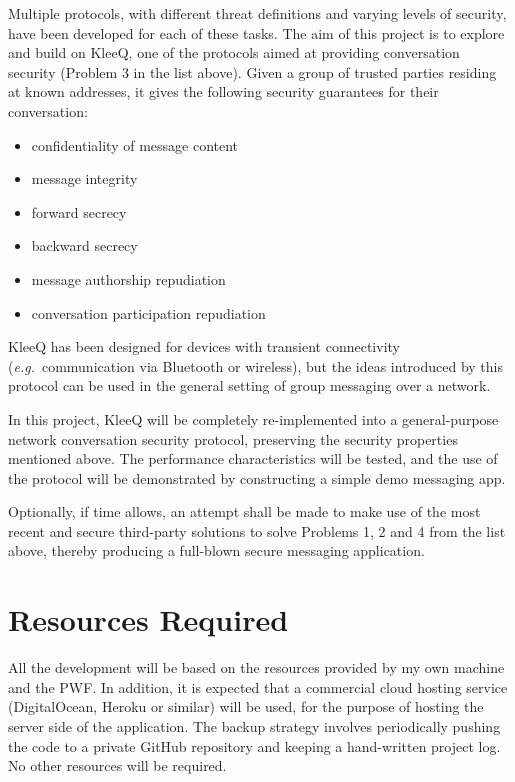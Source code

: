 \documentclass[a4paper, twoside, 12pt]{report}
\begin{document}
\begin{appendices}
\vspace{\baselineskip}
\noindent
Multiple protocols, with different threat definitions and varying levels of security, have been developed for each of these tasks. The aim of this project is to explore and build on KleeQ, one of the protocols aimed at providing conversation security (Problem 3 in the list above). Given a group of trusted parties residing at known addresses, it gives the following security guarantees for their conversation:
\begin{itemize}
    \item confidentiality of message content
    \item message integrity
    \item forward secrecy
    \item backward secrecy
    \item message authorship repudiation
    \item conversation participation repudiation
\end{itemize}
KleeQ has been designed for devices with transient connectivity (\textit{e.g.}~communication via Bluetooth or wireless), but the ideas introduced by this protocol can be used in the general setting of group messaging over a network.

\vspace{\baselineskip}
\noindent
In this project, KleeQ will be completely re-implemented into a general-purpose network conversation security protocol, preserving the security properties mentioned above. The performance characteristics will be tested, and the use of the protocol will be demonstrated by constructing a simple demo messaging app.

\vspace{\baselineskip}
\noindent
Optionally, if time allows, an attempt shall be made to make use of the most recent and secure third-party solutions to solve Problems 1, 2 and 4 from the list above, thereby producing a full-blown secure messaging application.


\section{Resources Required}
All the development will be based on the resources provided by my own machine and the PWF. In addition, it is expected that a commercial cloud hosting service (DigitalOcean, Heroku or similar) will be used, for the purpose of hosting the server side of the application. The backup strategy involves periodically pushing the code to a private GitHub repository and keeping a hand-written project log. No other resources will be required.



\end{appendices}
\end{document}
